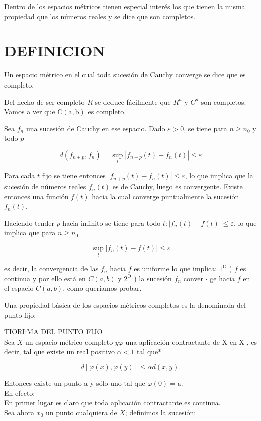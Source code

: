 \documentclass[10pt]{article}
\theoremstyle{plain}
\theoremstyle{definition}
\theoremstyle{remark}
\begin{document}
Dentro de los espacios métricos tienen especial interés los que tienen la misma propiedad que los números reales y se dice que son completos.

\section*{DEFINICION}
Un espacio métrico en el cual toda sucesión de Cauchy converge se dice que es completo.

Del hecho de ser completo $R$ se deduce fácilmente que $R^{n}$ y $C^{n}$ son completos. Vamos a ver que $\mathrm{C}(\mathrm{a}, \mathrm{b})$ es completo.

Sea $f_{n}$ una sucesión de Cauchy en ese espacio. Dado $\varepsilon>0$, se tiene para $n \geqslant n_{0}$ y todo $p$

$$
d\left(f_{n+p}, f_{n}\right)=\sup _{t}\left|f_{n+p}(t)-f_{n}(t)\right| \leqslant \varepsilon
$$

Para cada $t$ fijo se tiene entonces $\left|f_{n+p}(t)-f_{n}(t)\right| \leqslant \varepsilon$, lo que implica que la sucesión de números reales $f_{n}(t)$ es de Cauchy, luego es convergente. Existe entonces una función $f(t)$ hacia la cual converge puntualmente la sucesión $f_{n}(t)$.

Haciendo tender $p$ hacia infinito se tiene para todo $t:\left|f_{n}(t)-f(t)\right| \leqslant \varepsilon$, lo que implica que para $n \geqslant n_{0}$

$$
\sup _{t}\left|f_{n}(t)-f(t)\right| \leqslant \varepsilon
$$

es decir, la convergencia de las $f_{n}$ hacia $f$ es uniforme lo que implica: $1^{\mathrm{O}}$ ) $f$ es continua y por ello está en $C(a, b)$ y $2^{\mathrm{O}}$ ) la sucesión $f_{n}$ conver $\cdot$ ge hacia $f$ en el espacio $C(a, b)$, como queríamos probar.

Una propiedad básica de los espacios métricos completos es la denominada del punto fijo:

TIORI:MA DEL PUNTO FIJO\\
Sea $X$ un espacio métrico completo $y \varphi$ una aplicación contractante de X en X , es decir, tal que existe un real positivo $\alpha<1$ tal que*

$$
d[\varphi(x), \varphi(y)] \leqslant \alpha d(x, y) .
$$

Entonces existe un punto a y sólo uno tal que $\varphi(0)=\mathrm{a}$.\\
En efecto:\\
En primer lugar es claro que toda aplicación contractante es continua.\\
Sea ahora $x_{0}$ un punto cualquiera de $X$; definimos la sucesión:
\end{document}
